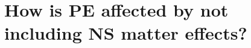 \documentclass[aps,prd,amsmath,floats,floatfix, twocolumn,
superscriptaddress,nofootinbib,showpacs]{revtex4-1}
\begin{document}
\section{How is PE affected by not including NS matter effects?}
\end{document}
